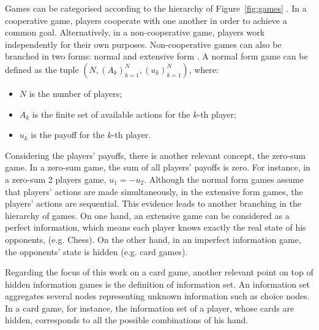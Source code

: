 Games can be categorised according to the hierarchy of Figure~\ref{fig:games} \cite{Osborne2011}.
In a cooperative game, players cooperate with one another in order to achieve a common goal.
Alternatively, in a non-cooperative game, players work independently for their own purposes.
Non-cooperative games can also be branched in two forms: normal and extensive form \cite{Shoham2010}.
A normal form game can be defined as the tuple $(N,(A_k)_{k=1}^{N},(u_k)_{k=1}^{N})$, where:
\begin{itemize}
\item $N$ is the number of players;
\item $A_k$ is the finite set of available actions for the $k$-th player;
\item $u_k$ is the payoff for the $k$-th player.
\end{itemize}
Considering the players' payoffs, there is another relevant concept, the zero-sum game.
In a zero-sum game, the sum of all players' payoffs is zero.
For instance, in a zero-sum 2 players game, $u_1 = -u_2$.
Although the normal form games assume that players' actions are made simultaneously, in the extensive form games, the players' actions are sequential.
This evidence leads to another branching in the hierarchy of games.
On one hand, an extensive game can be considered as a perfect information, which means each player knows exactly the real state of his opponents, (e.g. Chess).
On the other hand, in an imperfect information game, the opponents' state is hidden (e.g. card games).

Regarding the focus of this work on a card game, another relevant point on top of hidden information games is the definition of information set.
An information set aggregates several nodes representing unknown information such as choice nodes. In a card game, for instance, the information set of a player, whose cards are hidden, corresponds to all the possible combinations of his hand.



